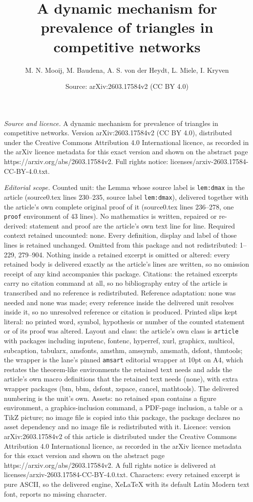 \documentclass[10pt,a4paper]{amsart}
\title[A dynamic mechanism for prevalence of triangles in competiti]{A dynamic mechanism for prevalence of triangles in competitive networks}
\author{M. N. Mooij, M. Baudena, A. S. von der Heydt, L. Miele, I. Kryven}
\date{Source: arXiv:2603.17584v2 (CC BY 4.0)}
\begin{document}
\maketitle

\noindent\emph{Source and licence.} A dynamic mechanism for prevalence of triangles in competitive networks. Version arXiv:2603.17584v2 (CC BY 4.0), distributed under the Creative Commons Attribution 4.0 International licence, as recorded in the arXiv licence metadata for this exact version and shown on the abstract page https://arxiv.org/abs/2603.17584v2. Full rights notice: licenses/arxiv-2603.17584-CC-BY-4.0.txt.\par\smallskip

\noindent\textit{Editorial scope.} Counted unit: the Lemma whose source label is \texttt{lem:dmax} in the article (source0.tex lines 230--235, source label \texttt{lem:dmax}), delivered together with the article's own complete original proof of it (source0.tex lines 236--278, one \texttt{proof} environment of 43 lines). No mathematics is written, repaired or re-derived: statement and proof are the article's own text line for line. Required context retained uncounted: none. Every definition, display and label of those lines is retained unchanged. Omitted from this package and not redistributed: 1--229, 279--904. Nothing inside a retained excerpt is omitted or altered: every retained body is delivered exactly as the article's lines are written, so no omission receipt of any kind accompanies this package. Citations: the retained excerpts carry no citation command at all, so no bibliography entry of the article is transcribed and no reference is redistributed. Reference adaptation: none was needed and none was made; every reference inside the delivered unit resolves inside it, so no unresolved reference or citation is produced. Printed slips kept literal: no printed word, symbol, hypothesis or number of the counted statement or of its proof was altered. Layout and class: the article's own class is \texttt{article} with packages including inputenc, fontenc, hyperref, xurl, graphicx, multicol, subcaption, tabularx, amsfonts, amsthm, amssymb, amsmath, dsfont, thmtools; the wrapper is the lane's pinned \texttt{amsart} editorial wrapper at 10pt on A4, which restates the theorem-like environments the retained text needs and adds the article's own macro definitions that the retained text needs (none), with extra wrapper packages (bm, bbm, dsfont, xspace, cancel, mathtools). The delivered numbering is the unit's own. Assets: no retained span contains a figure environment, a graphics-inclusion command, a PDF-page inclusion, a table or a TikZ picture; no image file is copied into this package, the package declares no asset dependency and no image file is redistributed with it. Licence: version arXiv:2603.17584v2 of this article is distributed under the Creative Commons Attribution 4.0 International licence, as recorded in the arXiv licence metadata for this exact version and shown on the abstract page https://arxiv.org/abs/2603.17584v2. A full rights notice is delivered at licenses/arxiv-2603.17584-CC-BY-4.0.txt. Characters: every retained excerpt is pure ASCII, so the delivered engine, XeLaTeX with its default Latin Modern text font, reports no missing character.
\end{document}
